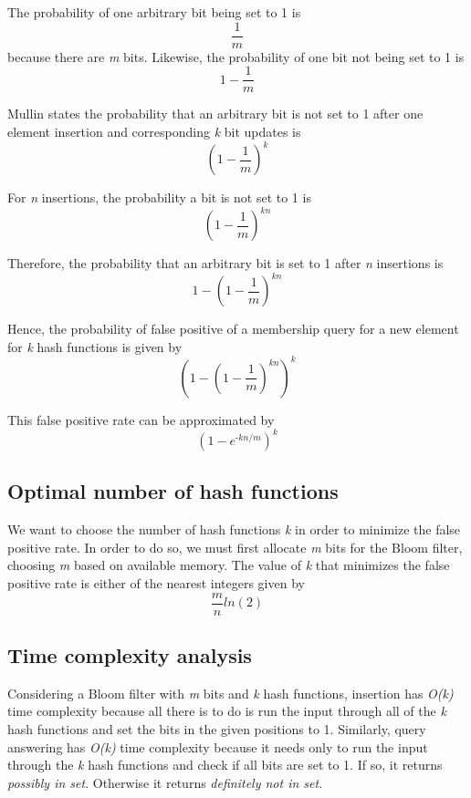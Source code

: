 The probability of one arbitrary bit being set to 1 is
\begin{equation}
    \frac{1}{m}
\end{equation}
because there are \textit{m} bits. Likewise, the probability of one bit not being set to 1 is
\begin{equation}
    1-\frac{1}{m}
\end{equation}

Mullin states the probability that an arbitrary bit is not set to 1 after one element insertion and corresponding \textit{k} bit updates is
\begin{equation}
    (1-\frac{1}{m})^\textit{k}
\end{equation}

For \textit{n} insertions, the probability a bit is not set to 1 is
\begin{equation}
    (1-\frac{1}{m})^\textit{kn}
\end{equation}

Therefore, the probability that an arbitrary bit is set to 1 after \textit{n} insertions is 
\begin{equation}
    1-(1-\frac{1}{m})^\textit{kn}
\end{equation}

Hence, the probability of false positive of a membership query for a new element for \textit{k} hash functions is given by
\begin{equation}
    (1-(1-\frac{1}{m})^\textit{kn})^\textit{k}
\end{equation}

This false positive rate can be approximated by 
\begin{equation}
    (1-e^\textit{-kn/m})^\textit{k}
\end{equation}


\subsection*{Optimal number of hash functions}
We want to choose the number of hash functions \textit{k} in order to minimize the false positive rate. In order to do so, we must first allocate \textit{m} bits for the Bloom filter, choosing \textit{m} based on available memory. The value of \textit{k} that minimizes the false positive rate is either of the nearest integers given by
\begin{equation}
    \frac{m}{n}ln(2)
\end{equation}

\subsection*{Time complexity analysis}
Considering a Bloom filter with \textit{m} bits and \textit{k} hash functions, insertion has \textit{O(k)} time complexity because all there is to do is run the input through all of the \textit{k} hash functions and set the bits in the given positions to 1. Similarly, query answering has \textit{O(k)} time complexity because it needs only to run the input through the \textit{k} hash functions and check if all bits are set to 1. If so, it returns \textit{possibly in set}. Otherwise it returns \textit{definitely not in set}. 

